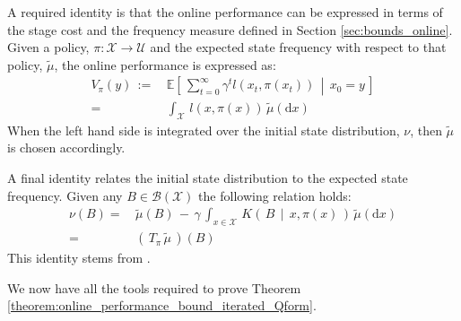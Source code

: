 \documentclass[journal]{IEEEtran}
\newcommand{\mbb}{\mathbb}
\newcommand{\mcal}{\mathcal}
\newcommand{\intd}[1]{\mathrm{d}#1}
\begin{document}
A required identity is that the online performance can be expressed in terms of the stage cost and the frequency measure defined in Section \ref{sec:bounds_online}. Given a policy, $\pi:\mcal{X} \rightarrow \mcal{U}$ and the expected state frequency with respect to that policy, $\tilde{\mu}$, the online performance is expressed as:
	\begin{equation} \label{eq:appendix_online_perf_measure_identity} \begin{aligned}
			V_{\pi}(y) \,:=&\, \mbb{E}\left[\, \sum\nolimits_{t=0}^{\infty} \gamma^t l(x_t,\pi(x_t))  \,\middle|\, x_0 = y\,\right]
			\\
			=&\, \int_{\mcal{X}} \, l(x,\pi(x)) \, \tilde{\mu} \left(\intd{x}\right)
		\end{aligned}
	\end{equation}
When the left hand side is integrated over the initial state distribution, $\nu$, then $\tilde{\mu}$ is chosen accordingly.


A final identity relates the initial state distribution to the expected state frequency. Given any $B \in \mcal{B}(\mcal{X})$ the following relation holds:
	\begin{equation} \label{eq:appendix_measures_identity} \begin{aligned}
			\nu(B) =&\, \tilde{\mu}(B) \,-\, \gamma \, \int_{x\in\mcal{X}} \, K\left(\, B \,\middle|\, x,\pi(x) \,\right) \, \tilde{\mu}\left(\intd{x}\right)
			\\
			=&\, \left(\, T_{\pi} \, \tilde{\mu} \,\right)(B)
		\end{aligned}
	\end{equation}
 This identity stems from \cite[eq. (6.3.10)]{hernandez_2012_discreteTimeMCP}.

\vspace{0.2cm}

We now have all the tools required to prove Theorem \ref{theorem:online_performance_bound_iterated_Qform}.


 
\end{document}
